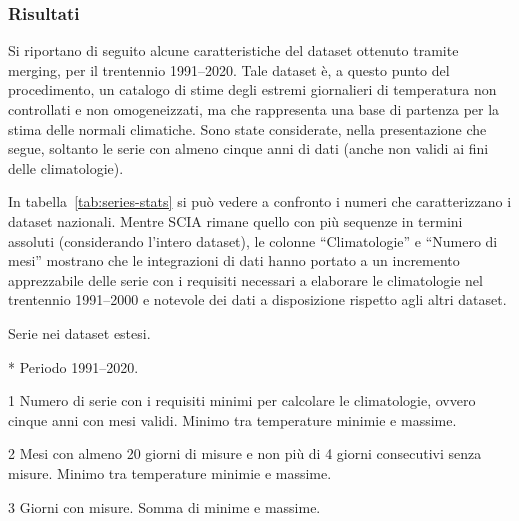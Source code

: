 \subsubsection{Risultati}\label{ch:results}
Si riportano di seguito alcune caratteristiche del dataset ottenuto tramite merging, per il trentennio 1991--2020. Tale dataset è, a questo punto del procedimento, un catalogo di stime degli estremi giornalieri di temperatura non controllati e non omogeneizzati, ma che rappresenta una base di partenza per la stima delle normali climatiche. Sono state considerate, nella presentazione che segue, soltanto le serie con almeno cinque anni di dati (anche non validi ai fini delle climatologie).

In tabella~\ref{tab:series-stats} si può vedere a confronto i numeri che caratterizzano i dataset nazionali. Mentre SCIA rimane quello con più sequenze in termini assoluti (considerando l'intero dataset), le colonne ``Climatologie'' e ``Numero di mesi'' mostrano che le integrazioni di dati hanno portato a un incremento apprezzabile delle serie con i requisiti necessari a elaborare le climatologie nel trentennio 1991--2000 e notevole dei dati a disposizione rispetto agli altri dataset.

\begin{table}[ht]
  \centering
  \begin{threeparttable}
    \caption{Serie nei dataset estesi.}\label{tab:series-stats}
    \scriptsize
    
    \begin{tablenotes}
    \item [*] Periodo 1991--2020.
    \item [1] Numero di serie con i requisiti minimi per calcolare le climatologie, ovvero cinque anni con mesi validi. Minimo tra temperature minimie e massime.
    \item [2] Mesi con almeno 20 giorni di misure e non più di 4 giorni consecutivi senza misure. Minimo tra temperature minimie e massime.
    \item [3] Giorni con misure. Somma di minime e massime.
    \end{tablenotes}
  \end{threeparttable}
\end{table}

